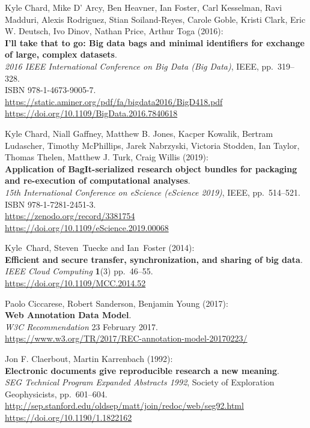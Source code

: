 \begin{thebibliography}{9}
Kyle Chard, Mike D' Arcy, Ben Heavner, Ian Foster, Carl
Kesselman, Ravi Madduri, Alexis Rodriguez, Stian Soiland-Reyes, Carole
Goble, Kristi Clark, Eric W. Deutsch, Ivo Dinov, Nathan Price, Arthur
Toga (2016):\\
\textbf{I'll take that to go: Big data bags and minimal identifiers for
exchange of large, complex datasets}.\\
\emph{2016 IEEE International Conference on Big Data (Big Data)}, IEEE,
pp.~319--328.\\
ISBN 978-1-4673-9005-7.\\
\url{https://static.aminer.org/pdf/fa/bigdata2016/BigD418.pdf}\\
\url{https://doi.org/10.1109/BigData.2016.7840618}

Kyle Chard, Niall Gaffney, Matthew B. Jones, Kacper Kowalik,
Bertram Ludascher, Timothy McPhillips, Jarek Nabrzyski, Victoria
Stodden, Ian Taylor, Thomas Thelen, Matthew J. Turk, Craig Willis
(2019):\\
\textbf{Application of BagIt-serialized research object bundles for
packaging and re-execution of computational analyses}.\\
\emph{15th International Conference on eScience (eScience 2019)}, IEEE,
pp.~514--521.\\
ISBN 978-1-7281-2451-3.\\
\url{https://zenodo.org/record/3381754}\\
\url{https://doi.org/10.1109/eScience.2019.00068}

Kyle~Chard, Steven~Tuecke and Ian~Foster (2014):\\
\textbf{Efficient and secure transfer, synchronization, and sharing of
big data}.\\
\emph{IEEE Cloud Computing} \textbf{1}(3) pp.~46--55.\\
\url{https://doi.org/10.1109/MCC.2014.52}

Paolo Ciccarese, Robert Sanderson, Benjamin Young (2017):\\
\textbf{Web Annotation Data Model}.\\
\emph{W3C Recommendation} 23 February 2017.\\
\url{https://www.w3.org/TR/2017/REC-annotation-model-20170223/}

Jon F. Claerbout, Martin Karrenbach (1992):\\
\textbf{Electronic documents give reproducible research a new
meaning}.\\
\emph{SEG Technical Program Expanded Abstracts 1992}, Society of
Exploration Geophysicists, pp.~601--604.\\
\url{http://sep.stanford.edu/oldsep/matt/join/redoc/web/seg92.html}\\
\url{https://doi.org/10.1190/1.1822162}


\end{thebibliography}
